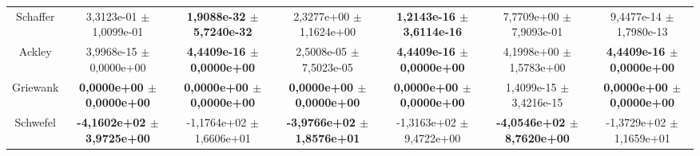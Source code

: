 \begin{center}
{\begin{longtable}{c|c c c c c c}
Schaffer & \makecell{{3,3123e-01 $\pm$} \\ {1,0099e-01} }
       & \makecell{{\bf1,9088e-32 $\pm$} \\ {\bf5,7240e-32}} 
       & \makecell{{ 2,3277e+00 $\pm$} \\ {1,1624e+00} }
       & \makecell{{\bf1,2143e-16 $\pm$} \\ {\bf3,6114e-16}} 
       & \makecell{{7,7709e+00 $\pm$ }\\ {7,9093e-01} }
       & \makecell{{9,4477e-14 $\pm$} \\ {1,7980e-13}}\\ %
        
Ackley & \makecell{{3,9968e-15 $\pm$} \\ {0,0000e+00} }
       & \makecell{{\bf4,4409e-16 $\pm$} \\ {\bf0,0000e+00}} 
       & \makecell{{ 2,5008e-05 $\pm$} \\ {7,5023e-05} }
       & \makecell{{\bf4,4409e-16 $\pm$} \\ {\bf0,0000e+00}} 
       & \makecell{{4,1998e+00 $\pm$ }\\ {1,5783e+00} }
       & \makecell{{\bf4,4409e-16 $\pm$} \\ {\bf0,0000e+00}}\\ %

Griewank & \makecell{{\bf0,0000e+00 $\pm$} \\ {\bf0,0000e+00} }
       & \makecell{{\bf0,0000e+00 $\pm$} \\ {\bf0,0000e+00}}
       & \makecell{{\bf0,0000e+00 $\pm$} \\ {\bf0,0000e+00} }
       & \makecell{{ \bf0,0000e+00 $\pm$} \\ {\bf0,0000e+00}} 
       & \makecell{{1,4099e-15 $\pm$ }\\ {3,4216e-15} }
       & \makecell{{\bf0,0000e+00 $\pm$} \\ {\bf0,0000e+00}}\\ %
        
Schwefel & \makecell{{\bf-4,1602e+02 $\pm$} \\ {\bf3,9725e+00} }
       & \makecell{-1,1764e+02 $\pm$ \\  1,6606e+01} 
       & \makecell{{\bf-3,9766e+02 $\pm$} \\ {\bf1,8576e+01} }
       & \makecell{{ -1,3163e+02 $\pm$} \\ { 9,4722e+00}} 
       & \makecell{{\bf-4,0546e+02 $\pm$ }\\ {\bf8,7620e+00} }
       & \makecell{{-1,3729e+02  $\pm$} \\ {1,1659e+01}}\\ %
        

\end{longtable}}
\end{center}
